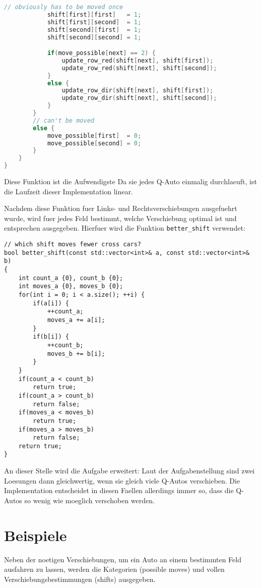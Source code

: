 \documentclass[a4paper,10pt,ngerman]{scrartcl}
\begin{document}
\begin{lstlisting}[language=C++]
            // obviously has to be moved once
            shift[first][first]   = 1;
            shift[first][second]  = 1;
            shift[second][first]  = 1;
            shift[second][second] = 1;

            if(move_possible[next] == 2) {
                update_row_red(shift[next], shift[first]);
                update_row_red(shift[next], shift[second]);
            }
            else {
                update_row_dir(shift[next], shift[first]);
                update_row_dir(shift[next], shift[second]);
            }
        }
        // can't be moved
        else {
            move_possible[first]  = 0;
            move_possible[second] = 0;
        }
    }
}
\end{lstlisting}
Diese Funktion ist die Aufwendigste
Da sie jedes Q-Auto einmalig durchlaeuft, ist die Laufzeit dieser Implementation linear.

Nachdem diese Funktion fuer Links- und Rechtsverschiebungen ausgefuehrt wurde, wird fuer jedes Feld bestimmt, welche Verschiebung optimal ist und entsprechen ausgegeben.
Hierfuer wird die Funktion \lstinline{better_shift} verwendet:
\begin{lstlisting}
// which shift moves fewer cross cars?
bool better_shift(const std::vector<int>& a, const std::vector<int>& b)
{
    int count_a {0}, count_b {0};
    int moves_a {0}, moves_b {0};
    for(int i = 0; i < a.size(); ++i) {
        if(a[i]) {
            ++count_a;
            moves_a += a[i];
        }
        if(b[i]) {
            ++count_b;
            moves_b += b[i];
        }
    }
    if(count_a < count_b)
        return true;
    if(count_a > count_b)
        return false;
    if(moves_a < moves_b)
        return true;
    if(moves_a > moves_b)
        return false;
    return true;
}
\end{lstlisting}
An dieser Stelle wird die Aufgabe erweitert:
Laut der Aufgabenstellung sind zwei Loesungen dann gleichwertig, wenn sie gleich viele Q-Autos verschieben.
Die Implementation entscheidet in diesen Faellen allerdings immer so, dass die Q-Autos so wenig wie moeglich verschoben werden.

\section{Beispiele}
Neben der noetigen Verschiebungen, um ein Auto an einem bestimmten Feld ausfahren zu lassen, werden die Kategorien (possible moves) und vollen Verschiebungsbestimmungen (shifts) ausgegeben.
\end{document}
